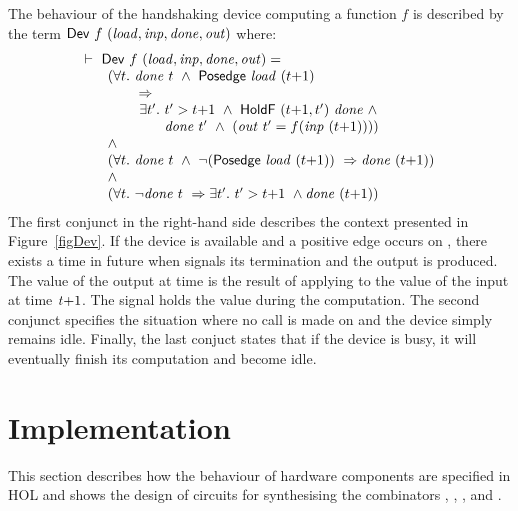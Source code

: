 \documentclass{llncs}
\begin{document}
The behaviour of the handshaking device computing a function $f$ is described by the term 
$\DEF{Dev}\ f\ \VAR{(load,inp,done,out)}$ where:
\[
\begin{array}{l}
\TURNST\ \DEF{Dev}\ f\ \VAR{(load,inp,done,out)} = \\
~~\quad     (\forall t.\ \VAR{done}\ t\ \AND\ \DEF{Posedge}\ \VAR{load}\ (t{+}1)\ \\
\phantom{~~\quad     (\forall t.~} \IMP \\
\phantom{~~\quad     (\forall t.\ ~ } \exists t'.\ t' > t{+}1\ \AND\ \DEF{HoldF}\ (t{+}1,t')\ \VAR{done}\ \AND \\
\phantom{~~\quad     (\forall t.\ ~ \exists t'.\ }  \VAR{done}\ t'\ \AND\ (\VAR{out}\ t' = f (\VAR{inp}\ (t{+}1))))\ \\
~~\quad  \AND \\
~~\quad (\forall t.\ \VAR{done}\ t\ \AND\ \NOT(\DEF{Posedge}\ \VAR{load}\ (t{+}1))\ \IMP  \VAR{done}\ (t{+}1))\\
~~\quad  \AND \\
~~\quad (\forall t.\ \NOT\VAR{done}\ t\ \IMP \exists t'.\ t' > t{+}1\ \AND \VAR{done}\ (t{+}1))\\
\end{array}
\]
The first conjunct in the right-hand side describes the context presented
in Figure~\ref{figDev}. If the device is available and a positive
edge occurs on , there exists a time  in future
when  signals its termination and the output is produced.
The value of the output at time  is the result
of applying  to the value of the input at time $\mathit{t}{+}1$.
The signal  holds the value  during the computation.
The second conjunct specifies the situation where no call
is made on  and the device simply remains idle.
Finally, the last conjuct states that if the device
is busy, it will eventually finish its computation
and become idle.

\section{Implementation}
\label{secImplementation}
This section describes how the behaviour of
hardware components are specified in HOL
and shows the design of circuits for
synthesising the combinators ,
, ,  and .
\end{document}
